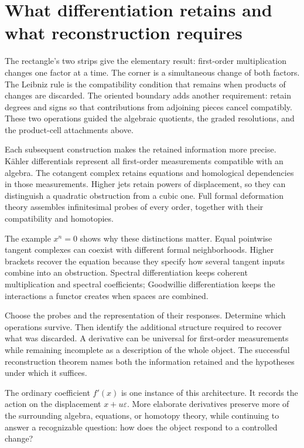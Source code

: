 \documentclass[11pt,letterpaper]{article}
\begin{document}
\clearpage
\section{What differentiation retains and what reconstruction requires}\label{sec:derivative-reconstruction}\hypertarget{derivative-reconstruction}{}

The rectangle's two strips give the elementary result: first-order multiplication changes one factor at a time. The corner is a simultaneous change of both factors. The Leibniz rule is the compatibility condition that remains when products of changes are discarded. The oriented boundary adds another requirement: retain degrees and signs so that contributions from adjoining pieces cancel compatibly. These two operations guided the algebraic quotients, the graded resolutions, and the product-cell attachments above.

Each subsequent construction makes the retained information more precise. Kähler differentials represent all first-order measurements compatible with an algebra. The cotangent complex retains equations and homological dependencies in those measurements. Higher jets retain powers of displacement, so they can distinguish a quadratic obstruction from a cubic one. Full formal deformation theory assembles infinitesimal probes of every order, together with their compatibility and homotopies.


The example \(
x^n=0
\) shows why these distinctions matter. Equal pointwise tangent complexes can coexist with different formal neighborhoods. Higher brackets recover the equation because they specify how several tangent inputs combine into an obstruction. Spectral differentiation keeps coherent multiplication and spectral coefficients; Goodwillie differentiation keeps the interactions a functor creates when spaces are combined.


Choose the probes and the representation of their responses. Determine which operations survive. Then identify the additional structure required to recover what was discarded. A derivative can be universal for first-order measurements while remaining incomplete as a description of the whole object. The successful reconstruction theorem names both the information retained and the hypotheses under which it suffices.


The ordinary coefficient \(
f'(x)
\) is one instance of this architecture. It records the action on the displacement \(
x+u\varepsilon
\). More elaborate derivatives preserve more of the surrounding algebra, equations, or homotopy theory, while continuing to answer a recognizable question: how does the object respond to a controlled change?
\end{document}
